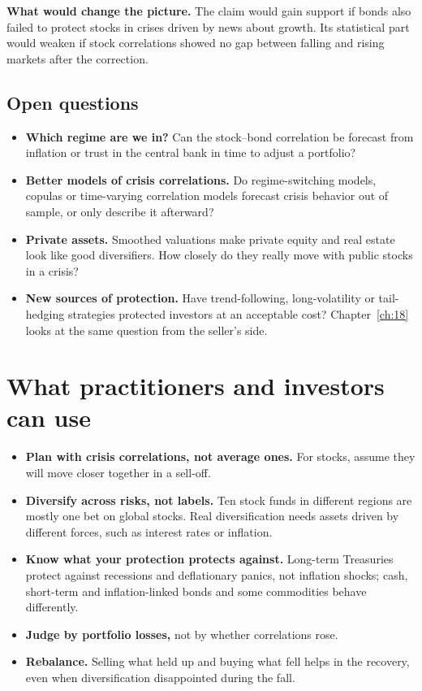 \textbf{What would change the picture.} The claim would gain support if bonds also failed to protect stocks in crises driven by news about growth. Its statistical part would weaken if stock correlations showed no gap between falling and rising markets after the correction.

\subsection{Open questions}
\label{sec:13-open}

\begin{itemize}
  \item \textbf{Which regime are we in?} Can the stock--bond correlation be forecast from inflation or trust in the central bank in time to adjust a portfolio?
  \item \textbf{Better models of crisis correlations.} Do regime-switching models, copulas or time-varying correlation models forecast crisis behavior out of sample, or only describe it afterward?
  \item \textbf{Private assets.} Smoothed valuations make private equity and real estate look like good diversifiers. How closely do they really move with public stocks in a crisis?
  \item \textbf{New sources of protection.} Have trend-following, long-volatility or tail-hedging strategies protected investors at an acceptable cost? Chapter~\ref{ch:18} looks at the same question from the seller's side.
\end{itemize}

\section{What practitioners and investors can use}
\label{sec:13-investors}

\begin{itemize}
  \item \textbf{Plan with crisis correlations, not average ones.} For stocks, assume they will move closer together in a sell-off.
  \item \textbf{Diversify across risks, not labels.} Ten stock funds in different regions are mostly one bet on global stocks. Real diversification needs assets driven by different forces, such as interest rates or inflation.
  \item \textbf{Know what your protection protects against.} Long-term Treasuries protect against recessions and deflationary panics, not inflation shocks; cash, short-term and inflation-linked bonds and some commodities behave differently.
  \item \textbf{Judge by portfolio losses,} not by whether correlations rose.
  \item \textbf{Rebalance.} Selling what held up and buying what fell helps in the recovery, even when diversification disappointed during the fall.
\end{itemize}

